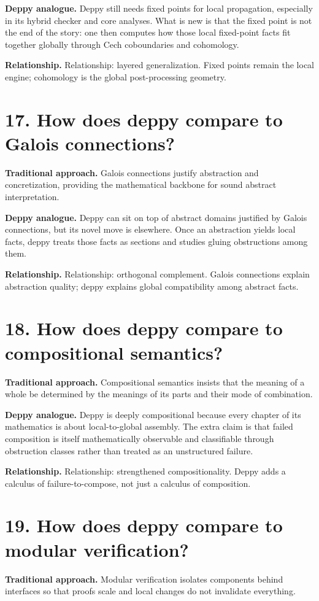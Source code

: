 \documentclass[11pt,openany]{book}
\begin{document}
\textbf{Deppy analogue.} Deppy still needs fixed points for local propagation, especially in its hybrid checker and core analyses. What is new is that the fixed point is not the end of the story: one then computes how those local fixed-point facts fit together globally through Cech coboundaries and cohomology.

\textbf{Relationship.} Relationship: layered generalization. Fixed points remain the local engine; cohomology is the global post-processing geometry.

\section*{17. How does deppy compare to Galois connections?}
\textbf{Traditional approach.} Galois connections justify abstraction and concretization, providing the mathematical backbone for sound abstract interpretation.

\textbf{Deppy analogue.} Deppy can sit on top of abstract domains justified by Galois connections, but its novel move is elsewhere. Once an abstraction yields local facts, deppy treats those facts as sections and studies gluing obstructions among them.

\textbf{Relationship.} Relationship: orthogonal complement. Galois connections explain abstraction quality; deppy explains global compatibility among abstract facts.

\section*{18. How does deppy compare to compositional semantics?}
\textbf{Traditional approach.} Compositional semantics insists that the meaning of a whole be determined by the meanings of its parts and their mode of combination.

\textbf{Deppy analogue.} Deppy is deeply compositional because every chapter of its mathematics is about local-to-global assembly. The extra claim is that failed composition is itself mathematically observable and classifiable through obstruction classes rather than treated as an unstructured failure.

\textbf{Relationship.} Relationship: strengthened compositionality. Deppy adds a calculus of failure-to-compose, not just a calculus of composition.

\section*{19. How does deppy compare to modular verification?}
\textbf{Traditional approach.} Modular verification isolates components behind interfaces so that proofs scale and local changes do not invalidate everything.
\end{document}
